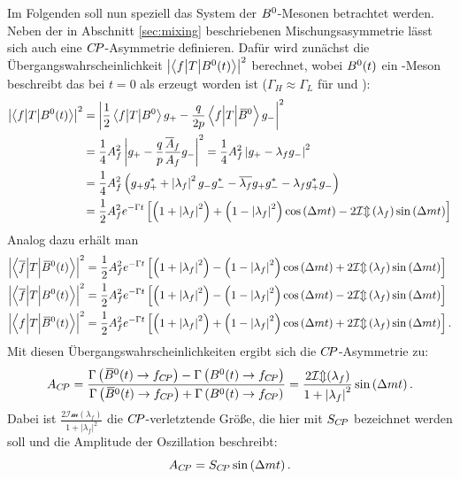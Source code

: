Im Folgenden soll nun speziell das System der ${{B}^0}$-Mesonen betrachtet werden. Neben der in Abschnitt \ref{sec:mixing} beschriebenen Mischungsasymmetrie lässt sich auch eine ${C\!P}$-Asymmetrie definieren. Dafür wird zunächst die Übergangswahrscheinlichkeit $\left|\left<f\big|T\big|{{B}^0}(t)\right>\right|^2$ berechnet, wobei ${{B}^0}(t)$ ein \B-Meson beschreibt das bei $t=0$ als \Bz erzeugt worden ist ($\Gamma_H\approx\Gamma_L$ für \Bz und \Bzb):
\begin{align}
\left|\left<f\big|T\big|{{B}^0}(t)\right>\right|^2&=\left|\frac{1}{2}\left<f\big|T\big|{{B}^0}\right>g_+-\frac{q}{2p}\left<f\Big|T\Big|{{\kern 0.18em\overline{\kern -0.18em B}{}}{}^0}\right>g_-\right|^2\nonumber\\
&=\frac{1}{4}A_f^2\left|g_+-\frac{q}{p}\frac{\overline{A}_f}{A_f}g_-\right|^2=\frac{1}{4}A_f^2\left|g_+-\lambda_fg_-\right|^2\nonumber\\
&=\frac{1}{4}A_f^2\left(g_+g_+^*+\left|\lambda_f\right|^2g_-g_-^*-\overline{\lambda_f}g_+g_-^*-\lambda_f g_+^*g_-\right)\nonumber\\
&=\frac{1}{2}A_f^2e^{-\Gamma t}\left[\left(1+\left|\lambda_f\right|^2\right)+\left(1-\left|\lambda_f\right|^2\right)\cos\left({\Delta m} t\right)-2\mathcal{Im}\left(\lambda_f\right)\sin\left({\Delta m} t\right)\right]
\end{align}
Analog dazu erhält man
\begin{align}
\left|\left<\overline{f}\Big|T\Big|{{\kern 0.18em\overline{\kern -0.18em B}{}}{}^0}(t)\right>\right|^2&=\frac{1}{2}A_f^2e^{-\Gamma t}\left[\left(1+\left|\lambda_f\right|^2\right)-\left(1-\left|\lambda_f\right|^2\right)\cos\left({\Delta m} t\right)+2\mathcal{Im}\left(\lambda_f\right)\sin\left({\Delta m} t\right)\right]\\
\left|\left<\overline{f}\Big|T\Big|{{B}^0}(t)\right>\right|^2&=\frac{1}{2}A_f^2e^{-\Gamma t}\left[\left(1+\left|\lambda_f\right|^2\right)-\left(1-\left|\lambda_f\right|^2\right)\cos\left({\Delta m} t\right)-2\mathcal{Im}\left(\lambda_f\right)\sin\left({\Delta m} t\right)\right]\\
\left|\left<f\Big|T\Big|{{\kern 0.18em\overline{\kern -0.18em B}{}}{}^0}(t)\right>\right|^2&=\frac{1}{2}A_f^2e^{-\Gamma t}\left[\left(1+\left|\lambda_f\right|^2\right)+\left(1-\left|\lambda_f\right|^2\right)\cos\left({\Delta m} t\right)+2\mathcal{Im}\left(\lambda_f\right)\sin\left({\Delta m} t\right)\right].
\end{align}
Mit diesen Übergangswahrscheinlichkeiten ergibt sich die ${C\!P}$-Asymmetrie zu:
\begin{equation}
A_{C\!P}=\frac{\Gamma\left({{\kern 0.18em\overline{\kern -0.18em B}{}}{}^0}(t)\rightarrow f_{C\!P}\right)-\Gamma\left({{B}^0}(t)\rightarrow f_{C\!P}\right)}{\Gamma\left({{\kern 0.18em\overline{\kern -0.18em B}{}}{}^0}(t)\rightarrow f_{C\!P}\right)+\Gamma\left({{B}^0}(t)\rightarrow f_{C\!P}\right)}=\frac{2\mathcal{Im}(\lambda_f)}{1+\left|\lambda_f\right|^2}\sin\left({\Delta m} t\right).\label{eq:cpv}
\end{equation}
Dabei ist $\frac{2\mathcal{Im}(\lambda_f)}{1+\left|\lambda_f\right|^2}$ die ${C\!P}$-verletztende Größe, die hier mit $S_{C\!P}$ bezeichnet werden soll und die Amplitude der Oszillation beschreibt: 
\begin{equation}
A_{C\!P}=S_{C\!P}\sin\left({\Delta m} t\right).
\end{equation}

